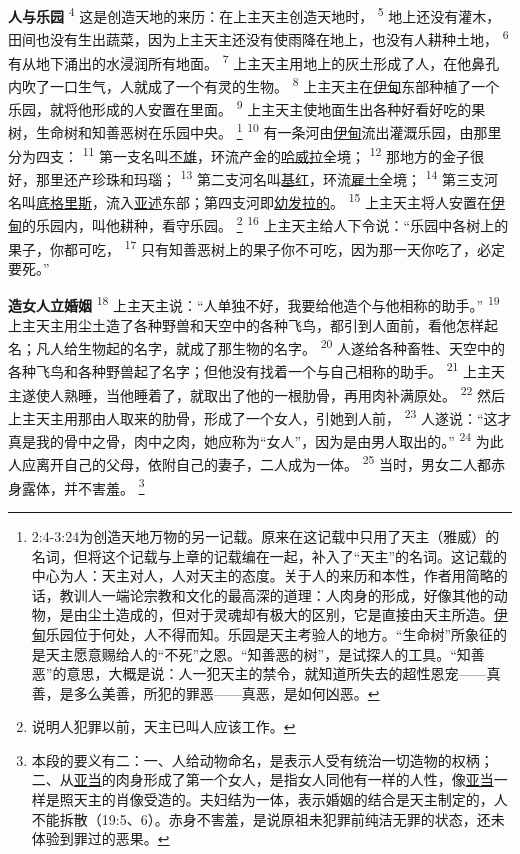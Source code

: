 \textbf{人与乐园\quad}
\textsuperscript{4}
这是创造天地的来历：在上主天主创造天地时，
\textsuperscript{5}
地上还没有灌木，田间也没有生出蔬菜，因为上主天主还没有使雨降在地上，也没有人耕种土地，
\textsuperscript{6}
有从地下涌出的水浸润所有地面。
\textsuperscript{7}
上主天主用地上的灰土形成了人，在他鼻孔内吹了一口生气，人就成了一个有灵的生物。
\textsuperscript{8}
上主天主在\uline{伊甸}东部种植了一个乐园，就将他形成的人安置在里面。
\textsuperscript{9}
上主天主使地面生出各种好看好吃的果树，生命树和知善恶树在乐园中央。
\footnote{2:4-3:24为创造天地万物的另一记载。原来在这记载中只用了天主（雅威）的名词，但将这个记载与上章的记载编在一起，补入了“天主”的名词。这记载的中心为人：天主对人，人对天主的态度。关于人的来历和本性，作者用简略的话，教训人一端论宗教和文化的最高深的道理：人肉身的形成，好像其他的动物，是由尘土造成的，但对于灵魂却有极大的区别，它是直接由天主所造。\uline{伊甸}乐园位于何处，人不得而知。乐园是天主考验人的地方。“生命树”所象征的是天主愿意赐给人的“不死”之恩。“知善恶的树”，是试探人的工具。“知善恶”的意思，大概是说：人一犯天主的禁令，就知道所失去的超性恩宠——真善，是多么美善，所犯的罪恶——真恶，是如何凶恶。}
\textsuperscript{10}
有一条河由\uline{伊甸}流出灌溉乐园，由那里分为四支：
\textsuperscript{11}
第一支名叫\uline{丕雄}，环流产金的\uline{哈威拉}全境；
\textsuperscript{12}
那地方的金子很好，那里还产珍珠和玛瑙；
\textsuperscript{13}
第二支河名叫\uline{基红}，环流\uline{雇士}全境；
\textsuperscript{14}
第三支河名叫\uline{底格里斯}，流入\uline{亚述}东部；第四支河即\uline{幼发拉的}。
\textsuperscript{15}
上主天主将人安置在\uline{伊甸}的乐园内，叫他耕种，看守乐园。
\footnote{说明人犯罪以前，天主已叫人应该工作。}
\textsuperscript{16}
上主天主给人下令说：“乐园中各树上的果子，你都可吃，
\textsuperscript{17}
只有知善恶树上的果子你不可吃，因为那一天你吃了，必定要死。”

\textbf{造女人立婚姻\quad}
\textsuperscript{18}
上主天主说：“人单独不好，我要给他造个与他相称的助手。”
\textsuperscript{19}
上主天主用尘土造了各种野兽和天空中的各种飞鸟，都引到人面前，看他怎样起名；凡人给生物起的名字，就成了那生物的名字。
\textsuperscript{20}
人遂给各种畜牲、天空中的各种飞鸟和各种野兽起了名字；但他没有找着一个与自己相称的助手。
\textsuperscript{21}
上主天主遂使人熟睡，当他睡着了，就取出了他的一根肋骨，再用肉补满原处。
\textsuperscript{22}
然后上主天主用那由人取来的肋骨，形成了一个女人，引她到人前，
\textsuperscript{23}
人遂说：“这才真是我的骨中之骨，肉中之肉，她应称为“女人”，因为是由男人取出的。”
\textsuperscript{24}
为此人应离开自己的父母，依附自己的妻子，二人成为一体。
\textsuperscript{25}
当时，男女二人都赤身露体，并不害羞。
\footnote{本段的要义有二：一、人给动物命名，是表示人受有统治一切造物的权柄；二、从\uline{亚当}的肉身形成了第一个女人，是指女人同他有一样的人性，像\uline{亚当}一样是照天主的肖像受造的。夫妇结为一体，表示婚姻的结合是天主制定的，人不能拆散（19:5、6）。赤身不害羞，是说原祖未犯罪前纯洁无罪的状态，还未体验到罪过的恶果。}

